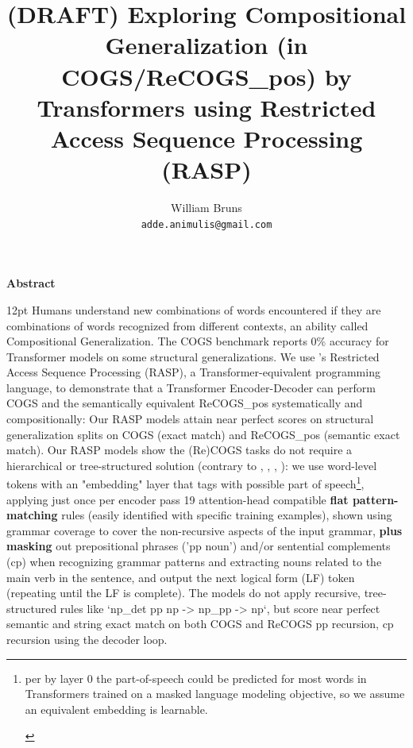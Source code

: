 \documentclass[11pt]{article}
\makeatletter
\renewenvironment{abstract}{\begin{center}\large\textbf{Abstract}\end{center}\begin{list}{}{\setlength{\rightmargin}{0.55cm}\setlength{\leftmargin}{0.55cm}}\item[]\ignorespaces\@setsize\normalsize{12pt}\xpt\@xpt}{\unskip\end{list}}
\makeatother
\begin{document}
\title{(DRAFT) Exploring Compositional Generalization (in COGS/ReCOGS\_pos) by Transformers using Restricted Access Sequence Processing (RASP)}

\author{William Bruns \\
  \texttt{adde.animulis@gmail.com}
}
\date{}

\maketitle

\begin{abstract}
Humans understand new combinations of words encountered if they are combinations of words recognized from different contexts, an ability called Compositional Generalization.
The COGS benchmark \citep{KimLinzen2020} reports 0\% accuracy for Transformer models on some structural generalizations.
We use \citep{Weiss2021}'s Restricted Access Sequence Processing (RASP), a Transformer-equivalent programming language, to demonstrate that a Transformer Encoder-Decoder can perform COGS and the semantically equivalent ReCOGS\_pos\citep{Wu2023} systematically and compositionally: Our RASP models attain near perfect scores on structural generalization splits on COGS (exact match) and ReCOGS\_pos (semantic exact match).
Our RASP models show the (Re)COGS tasks do not require a hierarchical or tree-structured solution (contrary to \citep{KimLinzen2020}, \citep{yao-koller-2022-structural}, \citep{murty2022characterizingintrinsiccompositionalitytransformers}, \citep{liu-etal-2021-learning-algebraic}): we use word-level tokens with an "embedding" layer that tags with possible part of speech\footnote{\begin{footnotesize}per \citep{tenney2019bertrediscoversclassicalnlp} by layer 0 the part-of-speech could be predicted for most words in Transformers trained on a masked language modeling objective, so we assume an equivalent embedding is learnable.\end{footnotesize}}, applying just once per encoder pass 19 attention-head compatible \textbf{flat pattern-matching} rules (easily identified with specific training examples), shown using grammar coverage \citep{fuzzingbook2023:GrammarCoverageFuzzer} to cover the non-recursive aspects of the input grammar, \textbf{plus masking} out prepositional phrases ('pp noun') and/or sentential complements (cp) when recognizing grammar patterns and extracting nouns related to the main verb in the sentence, and output the next logical form (LF) token (repeating until the LF is complete). The models do not apply recursive, tree-structured rules like `np\_det pp np -> np\_pp -> np`, but score near perfect semantic and string exact match on both COGS and ReCOGS pp recursion, cp recursion using the decoder loop.
\end{abstract}
\end{document}

